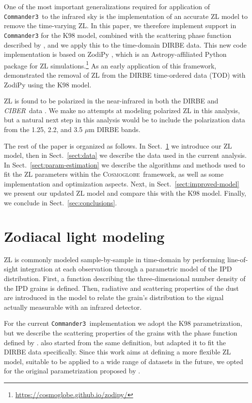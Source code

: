\documentclass[twocolumn]{aa}
\def\commanderthree{\texttt{Commander3}}
\def\CIBER{\textit{CIBER}}
\newcommand{\cosmoglobe}{\textsc{Cosmoglobe}}
\begin{document}
One of the most important generalizations required for application of
\commanderthree\ to the infrared sky is the implementation of an
accurate ZL model to remove the time-varying ZL. In this paper, we therefore implement 
support in \texttt{Commander3} for the K98 model, combined with the scattering phase function described 
by \citet{Hong}, and we apply this to the time-domain DIRBE data. 
This new code implementation is based on ZodiPy \citep{San2024}, which is an Astropy-affiliated 
Python package for ZL simulations.\footnote{\url{https://cosmoglobe.github.io/zodipy/}} As an early application of this framework, \cite{San2022} 
demonstrated the removal of ZL from the DIRBE time-ordered data (TOD) with ZodiPy using the 
K98 model. 

ZL is found to be polarized in the near-infrared in both the DIRBE and 
\CIBER\ data \citep{Berriman94,Takimoto2022,Takimoto2023}. We make no attempts at 
modeling polarized ZL in this analysis, but a natural next step in this 
analysis would be to include the polarization data from the 1.25, 2.2, 
and 3.5 $\mu$m DIRBE bands.

The rest of the paper is organized as follows. In
Sect.~\ref{sect:zodi-model} we introduce our ZL model, then in Sect.~\ref{sect:data} 
we describe the data used in the current analysis. In 
Sect.~\ref{sect:param-estimation} we describe the algorithms and methods
used to fit the ZL parameters within the \cosmoglobe\  framework, as well as some 
implementation and optimization aspects. 
Next, in Sect.~\ref{sect:improved-model} we present our updated 
ZL model and compare this with the K98 model. Finally, we
conclude in Sect.~\ref{sec:conclusions}.


\section{Zodiacal light modeling}\label{sect:zodi-model}
ZL is commonly modeled sample-by-sample in time-domain by performing
line-of-sight integration at each observation through a parametric
model of the IPD distribution. First, a function describing the three-dimensional 
number density of the IPD grains is defined. Then, radiative and scattering properties 
of the dust are introduced in the model to relate the grain's distribution to the 
signal actually measurable with an infrared detector.

For the current \commanderthree\ implementation we adopt the K98 parametrization, 
but we describe the scattering properties of the grains with the phase function 
defined by \citet{Hong}. \citet{kelsall1998} also started from the same definition, 
but adapted it to fit the DIRBE data specifically. Since this work aims at defining a 
more flexible ZL model, suitable to be applied to a wide range of datasets in 
the future, we opted for the original parametrization proposed by \citet{Hong}.
\end{document}
